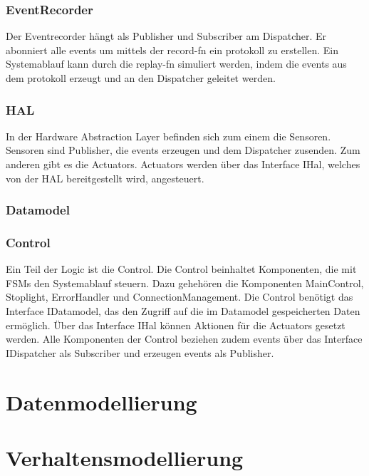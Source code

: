 \subsubsection{EventRecorder}
Der Eventrecorder hängt als Publisher und Subscriber am Dispatcher.
Er abonniert alle \glspl{event} um mittels der \gls{record-fn} ein \gls{protokoll} zu erstellen.
Ein Systemablauf kann durch die \gls{replay-fn} simuliert werden,
indem die \glspl{event} aus dem \gls{protokoll} erzeugt und an den Dispatcher geleitet werden.

\subsubsection{HAL}
In der Hardware Abstraction Layer befinden sich zum einem die Sensoren.
Sensoren sind Publisher, die \glspl{event} erzeugen und dem Dispatcher zusenden.
Zum anderen gibt es die Actuators. Actuators werden über das Interface IHal, welches von der HAL bereitgestellt wird, angesteuert.

\subsubsection{Datamodel}

\subsubsection{Control}
Ein Teil der Logic ist die Control. Die Control beinhaltet Komponenten, die mit FSMs den Systemablauf steuern.
Dazu gehehören die Komponenten MainControl, Stoplight, ErrorHandler und ConnectionManagement.
Die Control benötigt das Interface IDatamodel, das den Zugriff auf die im Datamodel gespeicherten Daten ermöglich.
Über das Interface IHal können Aktionen für die Actuators gesetzt werden.
Alle Komponenten der Control beziehen zudem \glspl{event} über das Interface IDispatcher als Subscriber und erzeugen \glspl{event} als Publisher.



\section{Datenmodellierung}\label{sec:datenmodellierung}



\section{Verhaltensmodellierung}\label{sec:verhaltensmodellierung}


